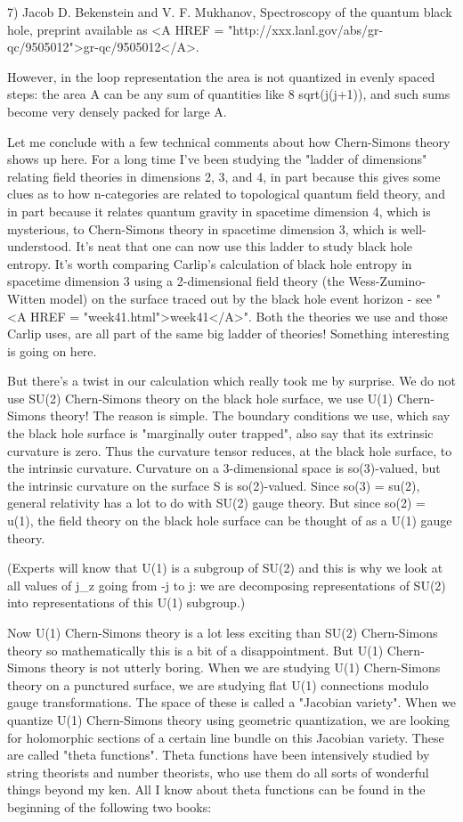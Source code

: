 7) Jacob D. Bekenstein and V. F. Mukhanov, Spectroscopy of the quantum
black hole, preprint available as <A HREF = "http://xxx.lanl.gov/abs/gr-qc/9505012">gr-qc/9505012</A>.

However, in the loop representation the area is not quantized in evenly
spaced steps: the area A can be any sum of quantities like 8 \pi  \gamma 
sqrt(j(j+1)), and such sums become very densely packed for large A.

Let me conclude with a few technical comments about how Chern-Simons
theory shows up here.  For a long time I've been studying the "ladder of
dimensions" relating field theories in dimensions 2, 3, and 4, in part
because this gives some clues as to how n-categories are related to
topological quantum field theory, and in part because it relates quantum
gravity in spacetime dimension 4, which is mysterious, to Chern-Simons
theory in spacetime dimension 3, which is well-understood.  It's neat
that one can now use this ladder to study black hole entropy.  It's
worth comparing Carlip's calculation of black hole entropy in spacetime
dimension 3 using a 2-dimensional field theory (the Wess-Zumino-Witten
model) on the surface traced out by the black hole event horizon - see
"<A HREF = "week41.html">week41</A>".  Both the theories we use and those Carlip uses, are all part
of the same big ladder of theories!  Something interesting is going on
here.

But there's a twist in our calculation which really took me by surprise.
We do not use SU(2) Chern-Simons theory on the black hole surface, we
use U(1) Chern-Simons theory!  The reason is simple.  The boundary
conditions we use, which say the black hole surface is "marginally outer
trapped", also say that its extrinsic curvature is zero.  Thus the
curvature tensor reduces, at the black hole surface, to the intrinsic
curvature.  Curvature on a 3-dimensional space is so(3)-valued, but the
intrinsic curvature on the surface S is so(2)-valued.  Since so(3) =
su(2), general relativity has a lot to do with SU(2) gauge theory.  But
since so(2) = u(1), the field theory on the black hole surface can be
thought of as a U(1) gauge theory.  

(Experts will know that U(1) is a subgroup of SU(2) and this is why we
look at all values of j_{z} going from -j to j: we are decomposing
representations of SU(2) into representations of this U(1) subgroup.)

Now U(1) Chern-Simons theory is a lot less exciting than SU(2)
Chern-Simons theory so mathematically this is a bit of a disappointment.
But U(1) Chern-Simons theory is not utterly boring.  When we are
studying U(1) Chern-Simons theory on a punctured surface, we are
studying flat U(1) connections modulo gauge transformations.  The space
of these is called a "Jacobian variety".  When we quantize U(1)
Chern-Simons theory using geometric quantization, we are looking for
holomorphic sections of a certain line bundle on this Jacobian variety.
These are called "theta functions".  Theta functions have been
intensively studied by string theorists and number theorists, who use
them do all sorts of wonderful things beyond my ken.  All I know about
theta functions can be found in the beginning of the following two
books:

